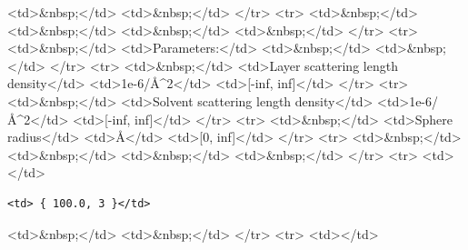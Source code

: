 \textless{}td\textgreater{}\&nbsp;\textless{}/td\textgreater{} \textless{}td\textgreater{}\&nbsp;\textless{}/td\textgreater{} \textless{}/tr\textgreater{} \textless{}tr\textgreater{} \textless{}td\textgreater{}\&nbsp;\textless{}/td\textgreater{} \textless{}td\textgreater{}\&nbsp;\textless{}/td\textgreater{} \textless{}td\textgreater{}\&nbsp;\textless{}/td\textgreater{} \textless{}td\textgreater{}\&nbsp;\textless{}/td\textgreater{} \textless{}/tr\textgreater{} \textless{}tr\textgreater{} \textless{}td\textgreater{}\&nbsp;\textless{}/td\textgreater{} \textless{}td\textgreater{}Parameters:\textless{}/td\textgreater{} \textless{}td\textgreater{}\&nbsp;\textless{}/td\textgreater{} \textless{}td\textgreater{}\&nbsp;\textless{}/td\textgreater{} \textless{}/tr\textgreater{} \textless{}tr\textgreater{} \textless{}td\textgreater{}\&nbsp;\textless{}/td\textgreater{} \textless{}td\textgreater{}Layer scattering length density\textless{}/td\textgreater{} \textless{}td\textgreater{}1e-6/\AA{}\textasciicircum{}2\textless{}/td\textgreater{} \textless{}td\textgreater{}[-inf, inf]\textless{}/td\textgreater{} \textless{}/tr\textgreater{} \textless{}tr\textgreater{} \textless{}td\textgreater{}\&nbsp;\textless{}/td\textgreater{} \textless{}td\textgreater{}Solvent scattering length density\textless{}/td\textgreater{} \textless{}td\textgreater{}1e-6/\AA{}\textasciicircum{}2\textless{}/td\textgreater{} \textless{}td\textgreater{}[-inf, inf]\textless{}/td\textgreater{} \textless{}/tr\textgreater{} \textless{}tr\textgreater{} \textless{}td\textgreater{}\&nbsp;\textless{}/td\textgreater{} \textless{}td\textgreater{}Sphere radius\textless{}/td\textgreater{} \textless{}td\textgreater{}\AA{}\textless{}/td\textgreater{} \textless{}td\textgreater{}[0, inf]\textless{}/td\textgreater{} \textless{}/tr\textgreater{} \textless{}tr\textgreater{} \textless{}td\textgreater{}\&nbsp;\textless{}/td\textgreater{} \textless{}td\textgreater{}\&nbsp;\textless{}/td\textgreater{} \textless{}td\textgreater{}\&nbsp;\textless{}/td\textgreater{} \textless{}td\textgreater{}\&nbsp;\textless{}/td\textgreater{} \textless{}/tr\textgreater{} \textless{}tr\textgreater{} \textless{}td\textgreater{}\textless{}/td\textgreater{}

\begin{verbatim}
<td> { 100.0, 3 }</td>
\end{verbatim}

\textless{}td\textgreater{}\&nbsp;\textless{}/td\textgreater{} \textless{}td\textgreater{}\&nbsp;\textless{}/td\textgreater{} \textless{}/tr\textgreater{} \textless{}tr\textgreater{} \textless{}td\textgreater{}\textless{}/td\textgreater{}

